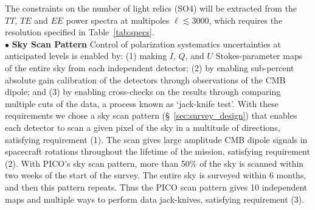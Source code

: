 \documentclass[PICOReport.tex]{subfiles}
\begin{document}
The constraints on the number of light relics (SO4) will be extracted from the $TT,\,TE$ and $EE$ power spectra at multipoles $\ell \lesssim 3000$, which requires the resolution specified in Table~\ref{tab:specs}. \\
%
$\bullet$ {\bf Sky Scan Pattern} \hspace{0.1in} 
Control of polarization systematics uncertainties at anticipated levels is enabled by: (1) making $I$, $Q$, and $U$ Stokes-parameter maps of the entire sky from each independent detector; (2) by enabling sub-percent absolute gain calibration of the detectors through observations of the CMB dipole; and (3) by enabling cross-checks on the results through comparing multiple cuts of the data, a process known as `jack-knife test'.   With these requirements we chose a sky scan pattern (\S~\ref{sec:survey_design}) that enables each detector to scan a given pixel of the sky in a multitude of directions, satisfying requirement (1). The scan gives large amplitude CMB dipole signals in spacecraft rotations throughout the lifetime of the mission, satisfying requirement (2). With PICO's sky scan pattern, more than 50\% of the sky is  scanned within two weeks of the start of the survey. The entire sky is surveyed within 6 months, and then this pattern repeats. Thus the PICO scan pattern gives 10 independent maps and multiple ways to perform data jack-knives, satisfying requirement (3).   

 
\end{document}
